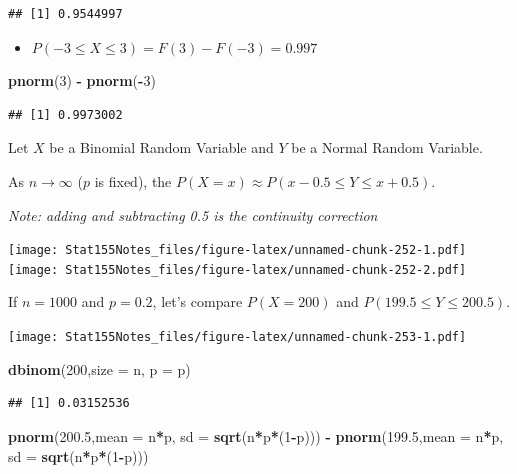 \documentclass[]{book}
\newenvironment{Shaded}{\begin{snugshade}}{\end{snugshade}}
\newcommand{\DataTypeTok}[1]{\textcolor[rgb]{0.13,0.29,0.53}{#1}}
\newcommand{\DecValTok}[1]{\textcolor[rgb]{0.00,0.00,0.81}{#1}}
\newcommand{\FloatTok}[1]{\textcolor[rgb]{0.00,0.00,0.81}{#1}}
\newcommand{\KeywordTok}[1]{\textcolor[rgb]{0.13,0.29,0.53}{\textbf{#1}}}
\newcommand{\NormalTok}[1]{#1}
\newcommand{\OperatorTok}[1]{\textcolor[rgb]{0.81,0.36,0.00}{\textbf{#1}}}
\newcommand{\StringTok}[1]{\textcolor[rgb]{0.31,0.60,0.02}{#1}}
\providecommand{\tightlist}{%
  \setlength{\itemsep}{0pt}\setlength{\parskip}{0pt}}
\begin{document}
\begin{verbatim}
## [1] 0.9544997
\end{verbatim}

\begin{itemize}
\tightlist
\item
  \(P(-3\leq X \leq 3) = F(3) - F(-3) = 0.997\)
\end{itemize}

\begin{Shaded}
\begin{Highlighting}[]
\KeywordTok{pnorm}\NormalTok{(}\DecValTok{3}\NormalTok{) }\OperatorTok{-}\StringTok{ }\KeywordTok{pnorm}\NormalTok{(}\OperatorTok{-}\DecValTok{3}\NormalTok{)}
\end{Highlighting}
\end{Shaded}

\begin{verbatim}
## [1] 0.9973002
\end{verbatim}

Let \(X\) be a Binomial Random Variable and \(Y\) be a Normal Random Variable.

As \(n\rightarrow \infty\) (\(p\) is fixed), the \(P(X = x) \approx P(x-0.5 \leq Y \leq x+0.5)\).

\emph{Note: adding and subtracting 0.5 is the continuity correction}

\texttt{[image: Stat155Notes\_files/figure-latex/unnamed-chunk-252-1.pdf]} \texttt{[image: Stat155Notes\_files/figure-latex/unnamed-chunk-252-2.pdf]}

If \(n=1000\) and \(p=0.2\), let's compare \(P(X=200)\) and \(P(199.5\leq Y\leq 200.5)\).

\texttt{[image: Stat155Notes\_files/figure-latex/unnamed-chunk-253-1.pdf]}

\begin{Shaded}
\begin{Highlighting}[]
\KeywordTok{dbinom}\NormalTok{(}\DecValTok{200}\NormalTok{,}\DataTypeTok{size =}\NormalTok{ n, }\DataTypeTok{p =}\NormalTok{ p)}
\end{Highlighting}
\end{Shaded}

\begin{verbatim}
## [1] 0.03152536
\end{verbatim}

\begin{Shaded}
\begin{Highlighting}[]
\KeywordTok{pnorm}\NormalTok{(}\FloatTok{200.5}\NormalTok{,}\DataTypeTok{mean =}\NormalTok{ n}\OperatorTok{*}\NormalTok{p, }\DataTypeTok{sd =} \KeywordTok{sqrt}\NormalTok{(n}\OperatorTok{*}\NormalTok{p}\OperatorTok{*}\NormalTok{(}\DecValTok{1}\OperatorTok{-}\NormalTok{p))) }\OperatorTok{-}\StringTok{ }\KeywordTok{pnorm}\NormalTok{(}\FloatTok{199.5}\NormalTok{,}\DataTypeTok{mean =}\NormalTok{ n}\OperatorTok{*}\NormalTok{p, }\DataTypeTok{sd =} \KeywordTok{sqrt}\NormalTok{(n}\OperatorTok{*}\NormalTok{p}\OperatorTok{*}\NormalTok{(}\DecValTok{1}\OperatorTok{-}\NormalTok{p)))}
\end{Highlighting}
\end{Shaded}
\end{document}
